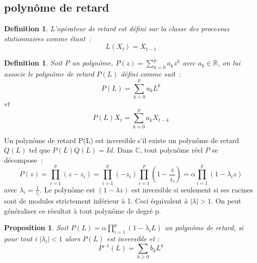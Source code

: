 \documentclass[11pt]{scrartcl} %
\newtheorem{Def}[theorem]{Definition}
\newtheorem{pro}[theorem]{Proposition}
\begin{document}
\subsection{polynôme de retard}
\begin{Def}
L'opérateur de retard est défini sur la classe des processus stationnaires comme étant~: 
$$
L(X_t)=X_{t-1}
$$
\end{Def}
\begin{Def}
Soit $P$ un polynôme, $P(z)=\sum_{k=0}^{p}a_kz^k$ avec $a_k\in\mathbb{R}$, on lui associe le polynôme de retard $P(L)$ défini comme suit~:
$$
P(L)=\sum_{k=0}^pa_kL^k
$$
et 
$$
P(L)X_t=\sum_{k=0}^pa_kX_{t-k}
$$
\end{Def}
Un polynôme de retard P(L) est inversible s'il existe un polynôme de retard $Q(L)$ tel que $P(L)Q(L)=Id$. Dans $\mathbb{C}$, tout polynôme réel $P$ se décompose~:
$$
P(z)=\prod_{i=1}^p(z-z_i)=\prod_{i=1}^p(-z_i)\prod_{i=1}^p(1-\frac{z}{z_i})=\alpha\prod_{i=1}^p(1-\lambda_i z)
$$
avec $\lambda_i=\frac{1}{z_i}$.
Le polynôme est $(1-\lambda z)$ est inversible si seulement si ses racines sont de modules strictement inférieur à 1. Ceci équivalent à $|\lambda|>1$. On peut généraliser ce résultat à tout polynôme de degré p.
\begin{pro}
Soit $P(L) = \alpha\prod_{i=1}^p(1-\lambda_i L)$ un polynôme de retard, si pour tout i $|\lambda_i|<1$ alors $P(L)$ est inversible et :
$$
P^{-1}(L)= \sum_{k\geq 0}b_kL^k
$$
\end{pro}
\end{document}
